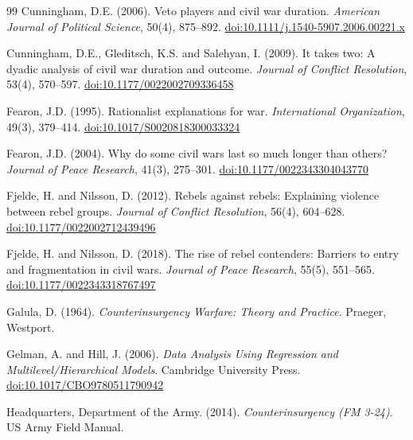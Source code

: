\documentclass[12pt,a4paper]{article}
\begin{document}
{\begin{thebibliography}{99}
Cunningham, D.E. (2006). Veto players and civil war duration. \textit{American Journal of Political Science}, 50(4), 875--892. \href{https://doi.org/10.1111/j.1540-5907.2006.00221.x}{doi:10.1111/j.1540-5907.2006.00221.x}

Cunningham, D.E., Gleditsch, K.S. and Salehyan, I. (2009). It takes two: A dyadic analysis of civil war duration and outcome. \textit{Journal of Conflict Resolution}, 53(4), 570--597. \href{https://doi.org/10.1177/0022002709336458}{doi:10.1177/0022002709336458}

Fearon, J.D. (1995). Rationalist explanations for war. \textit{International Organization}, 49(3), 379--414. \href{https://doi.org/10.1017/S0020818300033324}{doi:10.1017/S0020818300033324}

Fearon, J.D. (2004). Why do some civil wars last so much longer than others? \textit{Journal of Peace Research}, 41(3), 275--301. \href{https://doi.org/10.1177/0022343304043770}{doi:10.1177/0022343304043770}

Fjelde, H. and Nilsson, D. (2012). Rebels against rebels: Explaining violence between rebel groups. \textit{Journal of Conflict Resolution}, 56(4), 604--628. \href{https://doi.org/10.1177/0022002712439496}{doi:10.1177/0022002712439496}

Fjelde, H. and Nilsson, D. (2018). The rise of rebel contenders: Barriers to entry and fragmentation in civil wars. \textit{Journal of Peace Research}, 55(5), 551--565. \href{https://doi.org/10.1177/0022343318767497}{doi:10.1177/0022343318767497}

Galula, D. (1964). \textit{Counterinsurgency Warfare: Theory and Practice}. Praeger, Westport.

Gelman, A. and Hill, J. (2006). \textit{Data Analysis Using Regression and Multilevel/Hierarchical Models}. Cambridge University Press. \href{https://doi.org/10.1017/CBO9780511790942}{doi:10.1017/CBO9780511790942}

Headquarters, Department of the Army. (2014). \textit{Counterinsurgency (FM 3-24)}. US Army Field Manual.


\end{thebibliography}}
\end{document}
